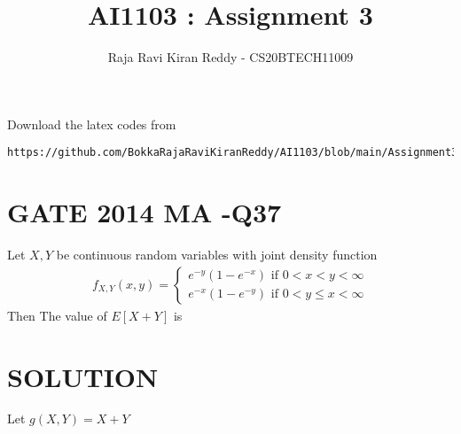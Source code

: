 \documentclass[journal,12pt,twocolumn]{IEEEtran}
\begin{document}
\let\vec\mathbf
\renewcommand{\thefigure}{\theproblem}
\def\putbox#1#2#3{\makebox[0in][l]{\makebox[#1][l]{}\raisebox{\baselineskip}[0in][0in]{\raisebox{#2}[0in][0in]{#3}}}}
     \def\rightbox#1{\makebox[0in][r]{#1}}
     \def\centbox#1{\makebox[0in]{#1}}
     \def\topbox#1{\raisebox{-\baselineskip}[0in][0in]{#1}}
     \def\midbox#1{\raisebox{-0.5\baselineskip}[0in][0in]{#1}}
\vspace{3cm}
\title{AI1103 : Assignment 3}
\author{Raja Ravi Kiran Reddy - CS20BTECH11009}
\maketitle
\newpage
\bigskip
\renewcommand{\thefigure}{\arabic{figure}}
\renewcommand{\thetable}{\arabic{table}}

Download the latex codes from 

\begin{lstlisting}
https://github.com/BokkaRajaRaviKiranReddy/AI1103/blob/main/Assignment3/Assignment3.tex
\end{lstlisting}
\section*{GATE 2014 MA -Q37}
Let $X ,Y$ be continuous random variables with joint density function
\begin{align*}
    f_{X,Y}(x,y)=\begin{cases}
    e^{-y}(1-e^{-x}) \text{   if } 0< x<y<\infty\\
    e^{-x}(1-e^{-y}) \text{   if } 0< y\leq x<\infty
    \end{cases}
\end{align*}
Then The value of $E[X+Y]$ is 
\section*{SOLUTION}
Let $g(X,Y)=X+Y$
\end{document}
